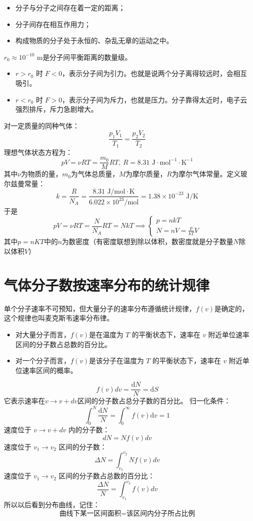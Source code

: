 \documentclass[lang=cn,11pt]{elegantbook}
\begin{document}
\begin{definition}[分子动理论的基本模型]
    \begin{itemize}
    \item 分子与分子之间存在着一定的距离；
    \item 分子间存在相互作用力；
    \item 构成物质的分子处于永恒的、杂乱无章的运动之中。
    \end{itemize}
    \(r_0\approx10^{-10}\text{ m}\)是分子间平衡距离的数量级。
    \begin{itemize}
    \item \(r>r_0\text{ 时 }F<0\)，表示分子间为引力。也就是说两个分子离得较远时，会相互吸引。
    \item \(r<r_0\text{ 时 }F>0\)，表示分子间为斥力，也就是压力。分子靠得太近时，电子云强烈排斥，斥力急剧增大。
    \end{itemize}
\end{definition}

\begin{definition}[理想气体状态方程及其简要形式]
对一定质量的同种气体：
\[
\frac{p_1V_1}{T_1}=\frac{p_2V_2}{T_2}
\]理想气体状态方程为：
\[
pV=\nu RT=\frac{m_0}{M}RT,~R=8.31\text{ J}\cdot\text{mol}^{-1}\cdot\text{K}^{-1}
\]其中\(\nu\)为物质的量，\(m_0\)为气体总质量，\(M\)为摩尔质量，\(R\)为摩尔气体常量。定义玻尔兹曼常量：
\[
k=\frac{R}{N_A}=\frac{8.31\text{ J/mol}\cdot\text{K}}{6.022\times10^{23}\text{/mol}}
=1.38\times10^{-23}\text{ J/K}
\]
于是\[pV=\nu RT=\frac{N}{N_A}RT=NkT\implies \begin{cases}p=nkT\\N=nV=\frac{p}{kT}V\end{cases}\]
其中$p=nKT$中的$n$为数密度（有密度联想到除以体积，数密度就是分子数量$N$除以体积$V$）
\end{definition}

\section{气体分子数按速率分布的统计规律}

\begin{definition}[麦克斯韦速率分布的概念]
    单个分子速率不可预知，但大量分子的速率分布遵循统计规律，\(f(v)\)是确定的，这个规律也叫麦克斯韦速率分布律。
    \begin{itemize}
    \item 对大量分子而言，\(f(v)\)是在温度为 \(T\) 的平衡状态下，速率在 \(v\) 附近单位速率区间的分子数占总数的百分比。
    \item 对一个分子而言，\(f(v)\)是该分子在温度为 \(T\) 的平衡状态下，速率在 \(v\) 附近单位速率区间的概率。
    \end{itemize}
    \[
f(v)dv=\frac{\mathrm d N}{N}=\mathrm dS
\]它表示速率在$v\to v+dv$区间的分子数占总分子数的百分比。
归一化条件：
\[
\int_0^N\frac{\mathrm dN}{N}
=
\int_0^\infty f(v)\mathrm dv
=1
\]速度位于 \(v\to v+dv\) 内的分子数：
\[
dN=Nf(v)dv
\]速度位于 \(v_1\to v_2\) 区间的分子数：
\[
\Delta N=\int_{v_1}^{v_2}Nf(v)dv
\]速度位于 \(v_1\to v_2\) 区间的分子数占总数的百分比：
\[
\frac{\Delta N}{N}
=
\int_{v_1}^{v_2}f(v)dv
\]所以以后看到分布曲线，记住：
\[
\boxed{\text{曲线下某一区间面积}=\text{该区间内分子所占比例}}
\]
\end{definition}
\end{document}
